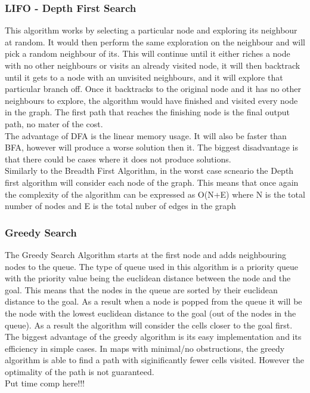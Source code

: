 \documentclass[a4paper,12pt]{article}
\begin{document}
			\subsubsection{LIFO - Depth First Search}
			
				This algorithm works by selecting a particular node and exploring its neighbour at random. It 
				would then perform the same exploration on the neighbour and will pick a random neighbour of its. 
				This will continue until it either riches a node with no other neighbours or visits an already 
				visited node, it will then backtrack until it gets to a node with an unvisited neighbours, and 
				it will explore that particular branch off. Once it backtracks to the original node and it has 
				no other neighbours to explore, the algorithm would have finished and visited every node in the 
				graph. The first path that reaches the finishing node is the final output path, no mater of the 
				cost. 
				\\
				The advantage of DFA is the linear memory usage. It will also be faster than BFA, however will
				produce a worse solution then it.  The biggest disadvantage is that there could be cases where 
				it does not produce solutions. 
				\\
				Similarly to the Breadth First Algorithm, in the worst case scneario the Depth first algorithm
				will consider each node of the graph. This means that once again the complexity of the algorithm
				can be expressed as O(N+E) where N is the total number of nodes and E is the total nuber of edges
				in the graph
			
			\subsubsection{Greedy Search}
				The Greedy Search Algorithm starts at the first node and adds neighbouring nodes to the queue. The
				type of queue used in this algorithm is a priority queue with the priority value being the euclidean
				distance between the node and the goal. This means that the nodes in the queue are sorted by their
				euclidean distance to the goal. As a result when a node is popped from the queue it will be the node
				with the lowest euclidean distance to the goal (out of the nodes in the queue). As a result the algorithm
				will consider the cells closer to the goal first.
				\\
				The biggest advantage of the greedy algorithm is its easy implementation and its efficiency in simple
				cases. In maps with minimal/no obstructions, the greedy algorithm is able to find a path with siginificantly
				fewer cells visited. However the optimality of the path is not guaranteed.
				\\
				Put time comp here!!!
\end{document}
